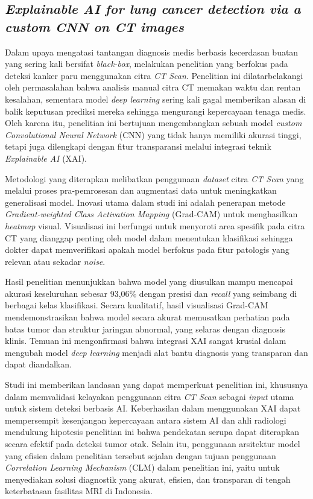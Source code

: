 \subsection{\textit{Explainable AI for lung cancer detection via a custom CNN on CT images}}
Dalam upaya mengatasi tantangan diagnosis medis berbasis kecerdasan buatan yang sering kali bersifat \textit{black-box}, \textcite{Hammad2025ExplainableAI} melakukan penelitian yang berfokus pada deteksi kanker paru menggunakan citra \textit{CT Scan}. Penelitian ini dilatarbelakangi oleh permasalahan bahwa analisis manual citra CT memakan waktu dan rentan kesalahan, sementara model \textit{deep learning} sering kali gagal memberikan alasan di balik keputusan prediksi mereka sehingga mengurangi kepercayaan tenaga medis. Oleh karena itu, penelitian ini bertujuan mengembangkan sebuah model \textit{custom Convolutional Neural Network} (CNN) yang tidak hanya memiliki akurasi tinggi, tetapi juga dilengkapi dengan fitur transparansi melalui integrasi teknik \textit{Explainable AI} (XAI).

Metodologi yang diterapkan melibatkan penggunaan \textit{dataset} citra \textit{CT Scan} yang melalui proses pra-pemrosesan dan augmentasi data untuk meningkatkan generalisasi model. Inovasi utama dalam studi ini adalah penerapan metode \textit{Gradient-weighted Class Activation Mapping} (Grad-CAM) untuk menghasilkan \textit{heatmap} visual. Visualisasi ini berfungsi untuk menyoroti area spesifik pada citra CT yang dianggap penting oleh model dalam menentukan klasifikasi sehingga dokter dapat memverifikasi apakah model berfokus pada fitur patologis yang relevan atau sekadar \textit{noise}.

Hasil penelitian menunjukkan bahwa model yang diusulkan mampu mencapai akurasi keseluruhan sebesar 93,06\% dengan presisi dan \textit{recall} yang seimbang di berbagai kelas klasifikasi. Secara kualitatif, hasil visualisasi Grad-CAM mendemonstrasikan bahwa model secara akurat memusatkan perhatian pada batas tumor dan struktur jaringan abnormal, yang selaras dengan diagnosis klinis. Temuan ini mengonfirmasi bahwa integrasi XAI sangat krusial dalam mengubah model \textit{deep learning} menjadi alat bantu diagnosis yang transparan dan dapat diandalkan.

Studi ini memberikan landasan yang dapat memperkuat penelitian ini, khususnya dalam memvalidasi kelayakan penggunaan citra \textit{CT Scan} sebagai \textit{input} utama untuk sistem deteksi berbasis AI. Keberhasilan \textcite{Hammad2025ExplainableAI} dalam menggunakan XAI dapat mempersempit kesenjangan kepercayaan antara sistem AI dan ahli radiologi mendukung hipotesis penelitian ini bahwa pendekatan serupa dapat diterapkan secara efektif pada deteksi tumor otak. Selain itu, penggunaan arsitektur model yang efisien dalam penelitian tersebut sejalan dengan tujuan penggunaan \textit{Correlation Learning Mechanism} (CLM) dalam penelitian ini, yaitu untuk menyediakan solusi diagnostik yang akurat, efisien, dan transparan di tengah keterbatasan fasilitas MRI di Indonesia.


